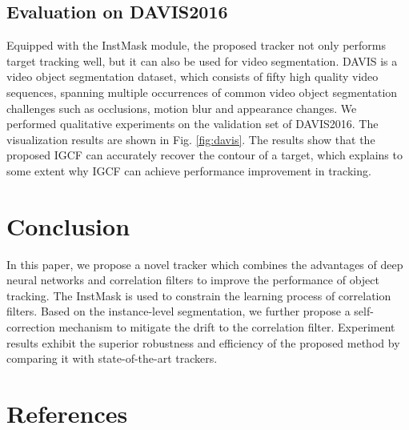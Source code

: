 \documentclass[review]{elsarticle}
\begin{document}
\begin{CJK*}{UTF8}{gbsn}
\subsection{Evaluation on DAVIS2016}
Equipped with the InstMask module, the proposed tracker not only performs target tracking well, but it can also be used for video segmentation. DAVIS \cite{Perazzi2016} is a video object segmentation dataset, which consists of fifty high quality video sequences, spanning multiple occurrences of common video object segmentation challenges such as occlusions, motion blur and appearance changes. We performed qualitative experiments on the validation set of DAVIS2016. The visualization results are shown in Fig. \ref{fig:davis}. The results show that the proposed IGCF can accurately recover the contour of a target, which explains to some extent why IGCF can achieve performance improvement in tracking.

\section{Conclusion}
In this paper, we propose a novel tracker which combines the advantages of deep neural networks and correlation filters to improve the performance of object tracking.
The InstMask is used to constrain the learning process of correlation filters. Based on the instance-level segmentation, we further propose a self-correction mechanism to mitigate the drift to the correlation filter.
Experiment results exhibit the superior robustness and efficiency of the proposed method by comparing it with state-of-the-art trackers.

\end{CJK*}

\section*{References}


\end{document}
